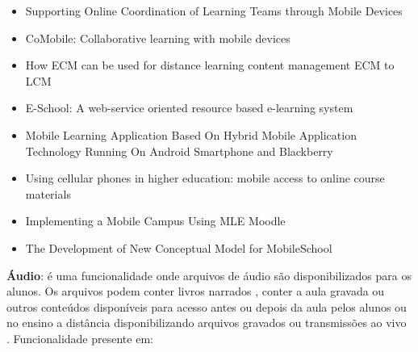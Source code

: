 \vspace{-5mm}
\begin{itemize}
    \item Supporting Online Coordination of Learning Teams through Mobile Devices \cite{roig-torres_supporting_2012}
    \item CoMobile: Collaborative learning with mobile devices \cite{nguyen_comobile:_2006}
    \item How ECM can be used for distance learning content management ECM to LCM \cite{daoudi_how_2012}
    \item E-School: A web-service oriented resource based e-learning system \cite{sultana_e-school:_2010}
    \item Mobile Learning Application Based On Hybrid Mobile Application Technology Running On Android Smartphone and Blackberry \cite{setiabudi_mobile_2013}
    \item Using cellular phones in higher education: mobile access to online course materials \cite{mermelstein_using_2005}
    \item Implementing a Mobile Campus Using MLE Moodle \cite{xhafa_implementing_2010}
    \item The Development of New Conceptual Model for MobileSchool \cite{hashim_development_2012}
\end{itemize}

\textbf{Áudio}: é uma funcionalidade onde arquivos de áudio são disponibilizados para os alunos. Os arquivos podem conter livros narrados \cite{mermelstein_using_2005}, conter a aula gravada ou outros conteúdos disponíveis para acesso antes ou depois da aula pelos alunos \cite{boyinbode_mobile_2012} ou no ensino a distância disponibilizando arquivos gravados ou transmissões ao vivo \cite{hoganson_distance-learning_2009, rodriguez-alsina_unified_2010}.  Funcionalidade presente em: 

